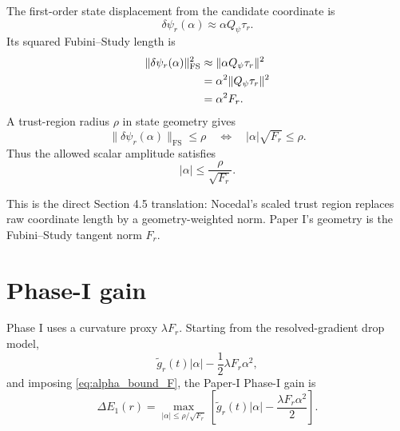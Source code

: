 \documentclass[10pt,twocolumn]{article}
\newcommand{\FS}{\mathrm{FS}}
\begin{document}
The first-order state displacement from the candidate coordinate is
\begin{equation}
\delta\psi_r(\alpha)
\approx \alpha Q_\psi\tau_r.
\label{eq:delta_psi_alpha}
\end{equation}
Its squared Fubini--Study length is
\begin{align}
\|\delta\psi_r(\alpha)\|_{\FS}^2
&\approx
\|\alpha Q_\psi\tau_r\|^2\notag\\
&=\alpha^2\|Q_\psi\tau_r\|^2\notag\\
&=\alpha^2F_r.
\label{eq:FS_length_alpha}
\end{align}
A trust-region radius \(\rho\) in state geometry gives
\begin{equation}
\|\delta\psi_r(\alpha)\|_{\FS}\le\rho
\quad\Longleftrightarrow\quad
|\alpha|\sqrt{F_r}\le\rho.
\label{eq:FS_trust_constraint}
\end{equation}
Thus the allowed scalar amplitude satisfies
\begin{equation}
|\alpha|\le\frac{\rho}{\sqrt{F_r}}.
\label{eq:alpha_bound_F}
\end{equation}

\begin{paperbox}
This is the direct Section 4.5 translation: Nocedal's scaled trust region replaces raw coordinate length by a geometry-weighted norm. Paper I's geometry is the Fubini--Study tangent norm \(F_r\).
\end{paperbox}

\section{Phase-I gain}

Phase I uses a curvature proxy \(\lambda F_r\). Starting from the resolved-gradient drop model,
\begin{equation}
\widetilde g_r(t)|\alpha|-\frac12\lambda F_r\alpha^2,
\label{eq:phase1_objective_piece}
\end{equation}
and imposing \eqref{eq:alpha_bound_F}, the Paper-I Phase-I gain is
\begin{equation}
\boxed{
\Delta E_1(r)
=
\max_{|\alpha|\le \rho/\sqrt{F_r}}
\left[
\widetilde g_r(t)|\alpha|
-\frac{\lambda F_r\alpha^2}{2}
\right].
}
\label{eq:phase1_gain}
\end{equation}
\end{document}
